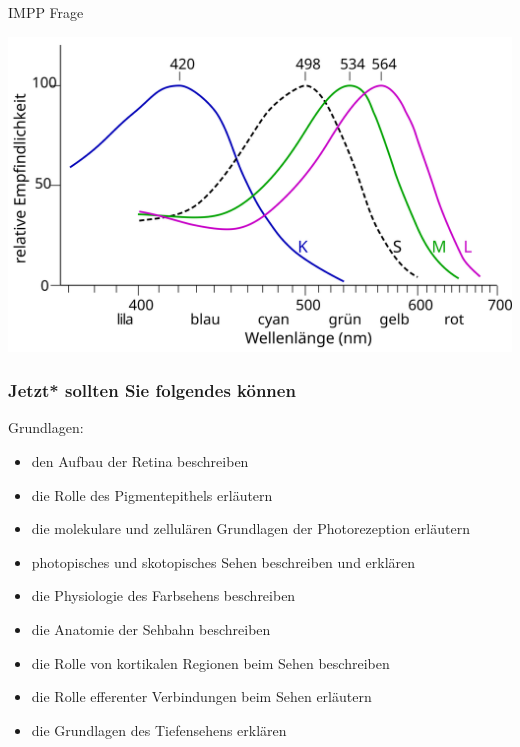 \documentclass{beamer}
\begin{document}
\begin{frame}{IMPP Frage}
    
    \begin{center}
        \includegraphics[width=\textwidth]{Cone-response-de.png}
    \end{center}
    
\end{frame}






\begin{frame}

 \frametitle{Jetzt* sollten Sie folgendes können}



\begin{block}{Grundlagen:}




\begin{itemize}

    \item 
den Aufbau der Retina beschreiben
    \item 
die Rolle des Pigmentepithels erläutern
    \item 
die molekulare und zellulären Grundlagen der Photorezeption erläutern
    \item 
photopisches und skotopisches Sehen beschreiben und erklären
    \item 
die Physiologie des Farbsehens beschreiben
    \item 
die Anatomie der Sehbahn beschreiben
    \item 
die Rolle von kortikalen Regionen beim Sehen beschreiben
    \item 
die Rolle efferenter Verbindungen beim Sehen erläutern
    \item 
die Grundlagen des Tiefensehens erklären
\end{itemize}


\end{block}

\end{frame}
\end{document}
